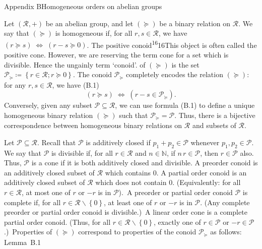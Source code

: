 \documentclass[
]{article}
\begin{document}
\protect{}\label{s000030}
Appendix BHomogeneous orders on abelian groups

Let \(\left( \mathcal{R}, + \right)\) be an abelian group, and let
\(( \succeq )\) be a binary relation on \(\mathcal{R}\). We say that
\(( \succeq )\) is homogeneous if, for all \(r,s \in \mathcal{R}\), we
have
\(\left. (r \succeq s)\;\Longleftrightarrow\;(r - s \succeq 0) \right.\).
The positive conoid\textsuperscript{16}16This object is often called the
positive cone. However, we are reserving the term cone for a set which
is divisible. Hence the ungainly term `conoid'. of \(( \succeq )\) is
the set
\(\mathcal{P}_{\succeq} ≔ \left\{ r \in \mathcal{R};r \succeq 0 \right\}\).
The conoid \(\mathcal{P}_{\succeq}\) completely encodes the relation
\(( \succeq )\): for any \(r,s \in \mathcal{R}\), we have
(B.1)\[\left. (r \succeq s)\;\Longleftrightarrow\;\left( r - s \in \mathcal{P}_{\succeq} \right)\text{.} \right.\]
Conversely, given any subset \(\mathcal{P} \subseteq \mathcal{R}\), we
can use formula (B.1) to define a unique homogeneous binary relation
\(( \succeq )\) such that \(\mathcal{P}_{\succeq} = \mathcal{P}\). Thus,
there is a bijective correspondence between homogeneous binary relations
on \(\mathcal{R}\) and subsets of \(\mathcal{R}\).

Let \(\mathcal{P} \subseteq \mathcal{R}\). Recall that \(\mathcal{P}\)
is additively closed if \(p_{1} + p_{2} \in \mathcal{P}\) whenever
\(p_{1},p_{2} \in \mathcal{P}\). We say that \(\mathcal{P}\) is
divisible if, for all \(r \in \mathcal{R}\) and \(n \in \mathbb{N}\), if
\(n\, r \in \mathcal{P}\), then \(r \in \mathcal{P}\) also. Thus,
\(\mathcal{P}\) is a cone if it is both additively closed and divisible.
A preorder conoid is an additively closed subset of \(\mathcal{R}\)
which contains 0. A partial order conoid is an additively closed subset
of \(\mathcal{R}\) which does not contain 0. (Equivalently: for all
\(r \in \mathcal{R}\), at most one of \(r\) or \(- r\) is in
\(\mathcal{P}\)).~A preorder or partial order conoid \(\mathcal{P}\) is
complete if, for all
\(r \in \mathcal{R} \smallsetminus \left\{ 0 \right\}\), at least one of
\(r\) or \(- r\) is in \(\mathcal{P}\). (Any complete preorder or
partial order conoid is divisible.)~A linear order cone is a complete
partial order conoid. (Thus, for all
\(r \in \mathcal{R} \smallsetminus \left\{ 0 \right\}\), exactly one of
\(r \in \mathcal{P}\) or \(- r \in \mathcal{P}\).)~Properties of
\(( \succeq )\) correspond to properties of the conoid
\(\mathcal{P}_{\succeq}\) as follows: Lemma~B.1
\end{document}
